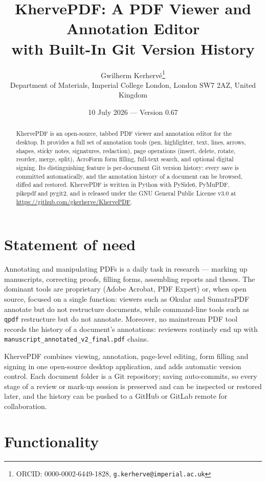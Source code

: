 \documentclass[11pt,a4paper]{article}
\title{KhervePDF: A PDF Viewer and Annotation Editor\\with Built-In Git Version History}
\author{Gwilherm Kerhervé\thanks{ORCID: 0000-0002-6449-1828, \texttt{g.kerherve@imperial.ac.uk}}\\
\small Department of Materials, Imperial College London, London SW7 2AZ, United Kingdom}
\date{10 July 2026 --- Version 0.67}
\begin{document}
\maketitle

\begin{abstract}
KhervePDF is an open-source, tabbed PDF viewer and annotation editor for the desktop. It provides a full set of annotation tools (pen, highlighter, text, lines, arrows, shapes, sticky notes, signatures, redaction), page operations (insert, delete, rotate, reorder, merge, split), AcroForm form filling, full-text search, and optional digital signing. Its distinguishing feature is per-document Git version history: every save is committed automatically, and the annotation history of a document can be browsed, diffed and restored. KhervePDF is written in Python with PySide6, PyMuPDF, pikepdf and pygit2, and is released under the GNU General Public License v3.0 at \url{https://github.com/gkerherve/KhervePDF}.
\end{abstract}

\section{Statement of need}

Annotating and manipulating PDFs is a daily task in research --- marking up manuscripts, correcting proofs, filling forms, assembling reports and theses. The dominant tools are proprietary (Adobe Acrobat, PDF Expert) or, when open source, focused on a single function: viewers such as Okular and SumatraPDF annotate but do not restructure documents, while command-line tools such as \texttt{qpdf} restructure but do not annotate. Moreover, no mainstream PDF tool records the history of a document's annotations: reviewers routinely end up with \texttt{manuscript\_annotated\_v2\_final.pdf} chains.

KhervePDF combines viewing, annotation, page-level editing, form filling and signing in one open-source desktop application, and adds automatic version control. Each document folder is a Git repository; saving auto-commits, so every stage of a review or mark-up session is preserved and can be inspected or restored later, and the history can be pushed to a GitHub or GitLab remote for collaboration.

\section{Functionality}
\end{document}
